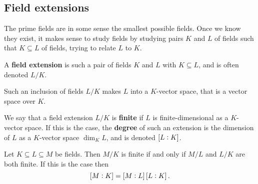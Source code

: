 \subsection{Field extensions}

The prime fields are in some sense the smallest possible fields. Once we know they exist, it makes sense to study fields by studying pairs $ K $ and $ L $ of fields such that $ K \subseteq L $ of fields, trying to relate $ L $ to $ K $.

\begin{definition}
A \textbf{field extension} is such a pair of fields $ K $ and $ L $ with $ K \subseteq L $, and is often denoted $ L / K $.
\end{definition}

\begin{note*}
Such an inclusion of fields $ L / K $ makes $ L $ into a $ K $-vector space, that is a vector space over $ K $.
\end{note*}

\begin{definition}
We say that a field extension $ L / K $ is \textbf{finite} if $ L $ is finite-dimensional as a $ K $-vector space. If this is the case, the \textbf{degree} of such an extension is the dimension of $ L $ as a $ K $-vector space $ \dim_K L $, and is denoted $ \sbr{L : K} $.
\end{definition}

\begin{proposition}
Let $ K \subseteq L \subseteq M $ be fields. Then $ M / K $ is finite if and only if $ M / L $ and $ L / K $ are both finite. If this is the case then
$$ \sbr{M : K} = \sbr{M : L}\sbr{L : K}. $$
\end{proposition}

